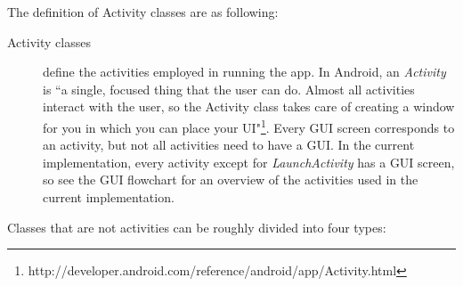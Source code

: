 The definition of Activity classes are as following:
\begin{description}

\item[Activity classes]
define the activities employed in running the app. In Android, an \emph{Activity} is ``a single, focused thing that the user can do. Almost all activities interact with the user, so the Activity class takes care of creating a window for you in which you can place your UI"\footnote{http://developer.android.com/reference/android/app/Activity.html}. Every GUI screen corresponds to an activity, but not all activities need to have a GUI. In the current implementation, every activity except for \textit{LaunchActivity} has a GUI screen, so see the GUI flowchart for an overview of the activities used in the current implementation. 

\end{description}

Classes that are not activities can be roughly divided into four types: 

